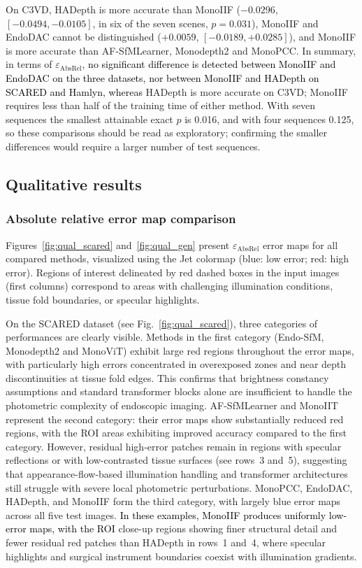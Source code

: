 \documentclass[a4paper,fleqn]{cas-dc}
\begin{document}
On C3VD, HADepth is more accurate than MonoIIF ($-0.0296$, $[-0.0494, -0.0105]$, in six of the seven scenes, $p=0.031$), MonoIIF and EndoDAC cannot be distinguished ($+0.0059$, $[-0.0189, +0.0285]$), and MonoIIF is more accurate than AF-SfMLearner, Monodepth2 and MonoPCC.
In summary, in terms of $\varepsilon_\textrm{AbsRel}$, \textcolor{black}{no significant difference is detected between MonoIIF and EndoDAC on the three datasets, nor between MonoIIF and HADepth on SCARED and Hamlyn, whereas} HADepth is more accurate on C3VD; MonoIIF requires less than half of the training time of either method. With seven sequences the smallest attainable exact $p$ is 0.016, and with four sequences 0.125, so these comparisons should be read as exploratory; confirming the smaller differences would require a larger number of test sequences.

%
\subsection{Qualitative results}
\subsubsection{Absolute relative error map comparison}

Figures~\ref{fig:qual_scared} and~\ref{fig:qual_gen} present $\varepsilon_{\text{AbsRel}}$ error maps for 
all compared methods, visualized using the Jet colormap (blue: low error; red: high error). Regions of interest delineated by red dashed boxes in the input images (first columns) correspond to areas with challenging illumination conditions, tissue fold boundaries, or specular highlights.


On the SCARED dataset (see Fig.~\ref{fig:qual_scared}), three categories of performances are clearly visible. 
Methods in the first category (Endo-SfM, Monodepth2 and MonoViT) exhibit large red regions throughout the error maps, with particularly high errors concentrated in overexposed zones and near depth discontinuities 
at tissue fold edges. This confirms that brightness constancy assumptions and standard transformer blocks alone are insufficient to handle the photometric complexity of endoscopic imaging. AF-SfMLearner and MonoIIT represent the second category: their error maps show substantially reduced red regions, with the ROI areas exhibiting improved accuracy compared to the first category. However, residual high-error patches remain in regions with specular reflections or with low-contrasted tissue surfaces (see rows~3 and~5), suggesting that appearance-flow-based illumination handling and transformer architectures still struggle with severe local photometric perturbations. MonoPCC, EndoDAC, HADepth, and MonoIIF form the third category, with largely blue error maps across all five test images. \textcolor{black}{In these examples, MonoIIF produces uniformly low-error maps, with the ROI} close-up regions showing finer structural detail and fewer residual red patches than HADepth in rows~1 and~4, where specular highlights and surgical instrument boundaries coexist with illumination gradients.
\end{document}
